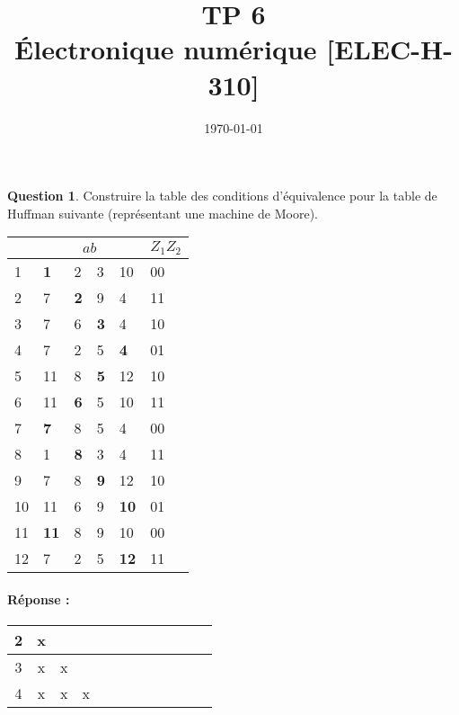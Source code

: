 \documentclass[11pt,a4paper,dvipsnames,]{article}
\date{\vspace{-1.7cm}\mydate\today}
\title{\vspace{-2cm} TP 6\\ Électronique numérique [ELEC-H-310] \ifthenelse{\boolean{corrige}}{~\\Corrigé}{}}
\theoremstyle{definition}%
\newtheorem{Q}{Question}[] %
\newcommand{\reponse}[1]{%
	\ifthenelse {\boolean{corrige}} {\paragraph{Réponse :} \color{darkblue}   #1\color{black}} {}
 }
\begin{document}
\pagestyle{empty}
\maketitle
\vspace*{1cm}

\begin{Q}
	Construire la table des conditions d'équivalence pour la table de Huffman suivante (représentant une machine de Moore).
	\begin{center}
		\begin{tabular}{|l|l|l|l|l|l|} \hline
			& \multicolumn{4}{c|}{$ab$} & $Z_1Z_2$ \\ \hline
			1 & \textbf{1} & 2 & 3 & 10 & 00 \\ \hline
			2 & 7 & \textbf{2} & 9 & 4 & 11 \\ \hline
			3 & 7 & 6 & \textbf{3} & 4 & 10 \\ \hline
			4 & 7 & 2 & 5 & \textbf{4} & 01 \\ \hline
			5 & 11 & 8 & \textbf{5} & 12 & 10 \\ \hline
			6 & 11 & \textbf{6} & 5 & 10 & 11 \\ \hline
			7 & \textbf{7} & 8 & 5 & 4 & 00 \\ \hline
			8 & 1 & \textbf{8} & 3 & 4 & 11 \\ \hline
			9 & 7 & 8 & \textbf{9} & 12 & 10 \\ \hline
			10 & 11 & 6 & 9 & \textbf{10} & 01 \\ \hline
			11 & \textbf{11} & 8 & 9 & 10 & 00 \\ \hline
			12 & 7 & 2 & 5 & \textbf{12} & 11 \\ \hline
		\end{tabular}
	\end{center}
	\reponse{
		\begin{center}
			\begin{tabular}{|c|c|c|c|c|c|c|c|c|c|c|c|} \hline%
				2 & x & \cellcolor{gray!20} & \cellcolor{gray!20} & \cellcolor{gray!20} & \cellcolor{gray!20} & \cellcolor{gray!20} & \cellcolor{gray!20} & \cellcolor{gray!20} & \cellcolor{gray!20} & \cellcolor{gray!20} & \cellcolor{gray!20}\\ \hline
				3 & x & x & \cellcolor{gray!20} & \cellcolor{gray!20} & \cellcolor{gray!20} & \cellcolor{gray!20} & \cellcolor{gray!20} & \cellcolor{gray!20} & \cellcolor{gray!20} & \cellcolor{gray!20} & \cellcolor{gray!20}\\ \hline
				4 & x & x & x & \cellcolor{gray!20} & \cellcolor{gray!20} & \cellcolor{gray!20} & \cellcolor{gray!20} & \cellcolor{gray!20} & \cellcolor{gray!20} & \cellcolor{gray!20} & \cellcolor{gray!20}\\ \hline

\end{tabular}
\end{center}}
\end{Q}
\end{document}
